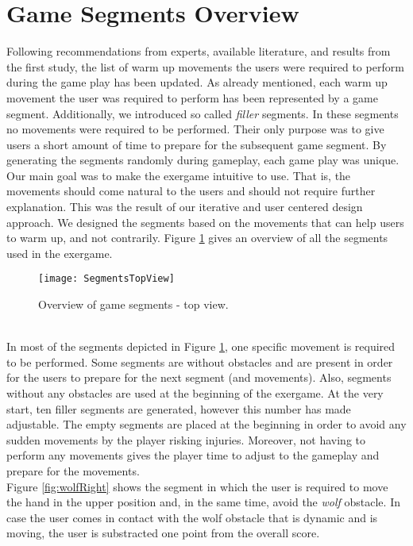 \section{Game Segments Overview}
Following recommendations from experts, available literature, and results from the first study, the list of warm up movements the users were required to perform during the game play has been updated. As already mentioned, each warm up movement the user was required to perform has been represented by a game segment. Additionally, we introduced so called \textit{filler} segments. In these segments no movements were required to be performed. Their only purpose was to give users a short amount of time to prepare for the subsequent game segment. By generating the segments randomly during gameplay, each game play was unique. Our main goal was to make the exergame intuitive to use. That is, the movements should come natural to the users and should not require further explanation. This was the result of our iterative and user centered design approach. We designed the segments based on the movements that can help users to warm up, and not contrarily. Figure \ref{fig:topview} gives an overview of all the segments used in the exergame. \\
\begin{figure}[h]
    \centering
    \texttt{[image: SegmentsTopView]}
    \caption{Overview of game segments - top view.}
    \label{fig:topview}
\end{figure}\\
In most of the segments depicted in Figure \ref{fig:topview}, one specific movement is required to be performed. Some segments are without obstacles and are present in order for the users to prepare for the next segment (and movements). Also, segments without any obstacles are used at the beginning of the exergame. At the very start, ten filler segments are generated, however this number has made adjustable. The empty segments are placed at the beginning in order to avoid any sudden movements by the player risking injuries. Moreover, not having to perform any movements gives the player time to adjust to the gameplay and prepare for the movements.\\\pagebreak Figure \ref{fig:wolfRight} shows the segment in which the user is required to move the hand in the upper position and, in the same time, avoid the \textit{wolf} obstacle. In case the user comes in contact with the wolf obstacle that is dynamic and is moving, the user is substracted one point from the overall score.\\
